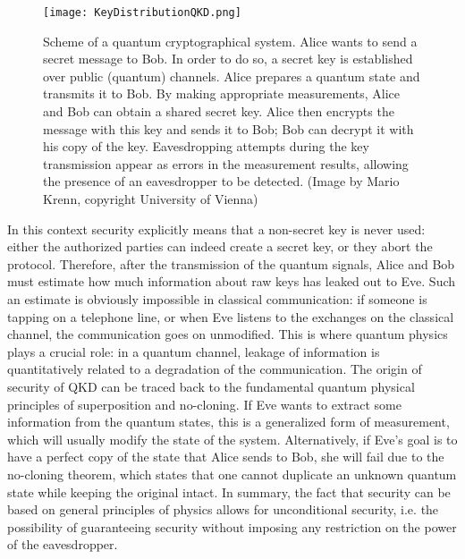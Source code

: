 \documentclass{article}
\begin{document}
\begin{figure}[h!]
\centering
\texttt{[image: KeyDistributionQKD.png]}
\caption{Scheme of a quantum cryptographical system. Alice wants to send a secret message to Bob. In order to do so, a secret key is established over public (quantum) channels. Alice prepares a quantum state and transmits it to Bob. By making appropriate measurements, Alice and Bob can obtain a shared secret key. Alice then encrypts the message with this key and sends it to Bob; Bob can decrypt it with his copy of the key. Eavesdropping attempts during the key transmission appear as errors in the measurement results, allowing the presence of an eavesdropper to be detected. (Image by Mario Krenn, copyright University of Vienna)}
\label{fig:qkdcrypt}
\end{figure}

In this context security explicitly means that a non-secret key is never used: either the authorized parties can indeed create a secret key, or they abort the protocol. Therefore, after the transmission of the quantum signals, Alice and Bob must estimate how much information about raw keys has leaked out to Eve. Such an estimate is obviously impossible in classical communication: if someone is tapping on a telephone line, or when Eve listens to the exchanges on the classical channel, the communication goes on unmodified. This is where quantum physics plays a crucial role: in a quantum channel, leakage of information is quantitatively related to a degradation of the communication.
The origin of security of QKD can be traced back to the fundamental quantum physical principles of superposition and no-cloning. If Eve wants to extract some information from the quantum states, this is a generalized form of measurement, which will usually modify the state of the system. Alternatively, if Eve's goal is to have a perfect copy of the state that Alice sends to Bob, she will fail due to the no-cloning theorem, which states that one cannot duplicate an unknown quantum state while keeping the original intact.
In summary, the fact that security can be based on general principles of physics allows for unconditional security, i.e. the possibility of guaranteeing security without imposing any restriction on the power of the eavesdropper.
\end{document}
